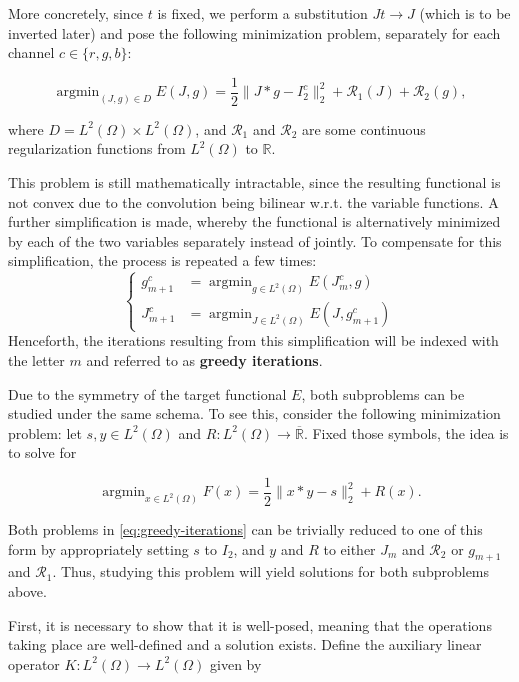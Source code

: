 \documentclass[twocolumn,twoside,a4paper,10pt]{IEEEtran}
\DeclareMathOperator*{\argmin}{\operatorname*{argmin}}
\begin{document}
More concretely, since \(t\) is fixed, we perform a substitution \(Jt\to J\) (which is to be inverted later) and pose the following minimization problem, separately for each channel \(c\in\{r, g, b\}\):

\begin{equation}\label{eq:full-I2-functional}
  \argmin_{(J, g)\in D} E(J, g) = \frac12\|J\ast g - I_2^c\|_2^2 + \mathcal{R}_1(J) + \mathcal{R}_2(g),
\end{equation}

where \(D = L^2(\Omega)\times L^2(\Omega)\), and \(\mathcal{R}_1\) and \(\mathcal{R}_2\) are some continuous regularization functions from \(L^2(\Omega)\) to \(\mathbb{R}\). 

This problem is still mathematically intractable, since the resulting functional is not convex due to the convolution being bilinear w.r.t. the variable functions. A further simplification is made, whereby the functional is alternatively minimized by each of the two variables separately instead of jointly. To compensate for this simplification, the process is repeated a few times:
\begin{equation}\label{eq:greedy-iterations}
  \left\{\begin{split}
    g_{m+1}^c &= \argmin_{g\in L^2(\Omega)} E(J_m^c, g) \\
    J_{m+1}^c &= \argmin_{J\in L^2(\Omega)} E(J, g_{m+1}^c)
  \end{split}\right.
\end{equation}
Henceforth, the iterations resulting from this simplification will be indexed with the letter \(m\) and referred to as \textbf{greedy iterations}.

Due to the symmetry of the target functional \(E\), both subproblems can be studied under the same schema. To see this, consider the following minimization problem: let \(s, y\in L^2(\Omega)\) and \(R\colon L^2(\Omega)\to\overline{\mathbb{R}}\). Fixed those symbols, the idea is to solve for

\[
  \argmin_{x\in L^2(\Omega)}F(x) = \frac12\|x\ast y - s\|_2^2 + R(x)
.\]

Both problems in \cref{eq:greedy-iterations} can be trivially reduced to one of this form by appropriately setting \(s\) to \(I_2\), and \(y\) and \(R\) to either \(J_m\) and \(\mathcal{R}_2\) or \(g_{m+1}\) and \(\mathcal{R}_1\). Thus, studying this problem will yield solutions for both subproblems above.

First, it is necessary to show that it is well-posed, meaning that the operations taking place are well-defined and a solution exists. Define the auxiliary linear operator \(K\colon L^2(\Omega)\to L^2(\Omega)\) given by
\end{document}
